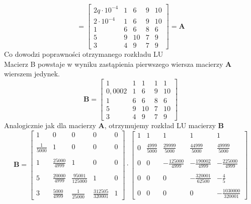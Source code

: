 \documentclass[a4paper]{article}
\begin{document}
$$
=
\left[
\begin{array}{ccccc}
2q\cdot 10^{-4} & 1&6&9&10\\
2\cdot 10^{-4}&1&6&9&10\\
1&6&6&8&6\\
5&9&10&7&9\\
3&4&9&7&9
\end{array}
\right]
=\textbf{A}
$$
Co dowodzi poprawności otrzymanego rozkładu LU \\
Macierz B powstaje w wyniku zastąpienia pierwszego wiersza macierzy \textbf{A} wierszem jedynek.
$$
\textbf{B}=
\left[
\begin{array}
{ccccc}
1&1&1&1&1\\
0,0002&1&6&9&10\\
1&6&6&8&6\\
5&9&10&7&10\\
3&4&9&7&9
\end{array}
\right]
$$
Analogicznie jak dla macierzy \textbf{A}, otrzymujemy rozkład LU macierzy \textbf{B}
$$
\textbf{B}=
\left[
\begin{array}
{ccccc}
1&0&0&0&0\\ \\
\frac{1}{5000}&1&0&0&0\\ \\
1&\frac{25000}{4999}&1&0&0\\ \\
5&\frac{20000}{4999}&\frac{95001}{125000}&1&0\\ \\
3&\frac{5000}{4999}&\frac{1}{25000}&\frac{312505}{320001}&1
\end{array}
\right]
\cdot
\left[
\begin{array}
{ccccc}
1&1&1&1&1\\ \\
0&\frac{4999}{5000}&\frac{29999}{5000}&\frac{44999}{5000}&\frac{49999}{5000}\\ \\
0&0&-\frac{125000}{4999}&-\frac{190002}{4999}&-\frac{225000}{4999}\\ \\
0&0&0&-\frac{320001}{62500}&-\frac{4}{5}\\ \\
0&0&0&0&-\frac{1030000}{320001}
\end{array}
\right]
$$
\end{document}
